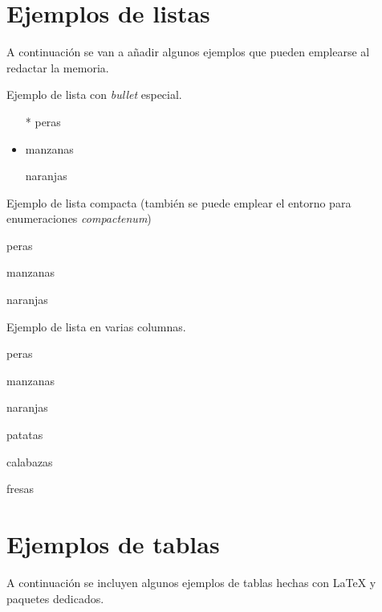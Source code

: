 

\section{Ejemplos de listas}
\label{sec:ejListas}
A continuación se van a añadir algunos ejemplos que pueden emplearse al redactar la memoria.

\noindent Ejemplo de lista con \emph{bullet} especial. 
\begin{itemize}
	\item[*] peras
	\item manzanas
	\item[\ding{170}] naranjas
\end{itemize}

\noindent Ejemplo de lista compacta (también se puede emplear el entorno para enumeraciones \emph{compactenum})
\begin{compactitem}
	\item peras
	\item manzanas
	\item naranjas
\end{compactitem}



\noindent Ejemplo de lista en varias columnas.
\begin{multicols}{2} %
	\begin{compactenum}
		\item peras
		\item manzanas
		\item naranjas
		\item patatas
		\item calabazas
		\item fresas
	\end{compactenum}
\end{multicols}


\newpage


\section{Ejemplos de tablas}
\label{sec:ejTablas}
A continuación se incluyen algunos ejemplos de tablas hechas con \LaTeX{} y paquetes dedicados.

